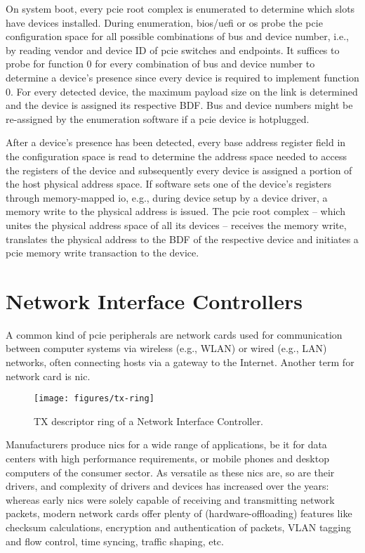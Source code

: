 On system boot, every \ac{pcie} root complex is enumerated to determine which
slots have devices installed. During enumeration, \acs{bios}/\acs{uefi} or
\ac{os} probe the \ac{pcie} configuration space for all possible combinations of
bus and device number, i.e., by reading vendor and device ID of \ac{pcie}
switches and endpoints. It suffices to probe for function 0 for every
combination of bus and device number to determine a device's presence since
every device is required to implement function 0. For every detected device, the
maximum payload size on the link is determined and the device is assigned its
respective BDF. Bus and device numbers might be re-assigned by the enumeration
software if a \ac{pcie} device is hotplugged.

After a device's presence has been detected, every base address register field
in the configuration space is read to determine the address space needed to
access the registers of the device and subsequently every device is assigned a
portion of the host physical address space. If software sets one of the device's
registers through memory-mapped \ac{io}, e.g., during device setup by a device
driver, a memory write to the physical address is issued. The \ac{pcie} root
complex -- which unites the physical address space of all its devices --
receives the memory write, translates the physical address to the BDF of the
respective device and initiates a \ac{pcie} memory write transaction to the
device.


\section{Network Interface Controllers}
\label{sec:nics}

A common kind of \ac{pcie} peripherals are network cards used for communication
between computer systems via wireless (e.g., WLAN) or wired (e.g., LAN)
networks, often connecting hosts via a gateway to the Internet. Another term for
network card is \acf{nic}.

\begin{figure}[!b]
    \centering
    \texttt{[image: figures/tx-ring]}
    \caption{TX descriptor ring of a Network Interface Controller.}
    \label{fig:tx-ring}
\end{figure}

Manufacturers produce \acp{nic} for a wide range of applications, be it for data
centers with high performance requirements, or mobile phones and desktop
computers of the consumer sector. As versatile as these \acp{nic} are, so are
their drivers, and complexity of drivers and devices has increased over the
years: whereas early \acp{nic} were solely capable of receiving and transmitting
network packets, modern network cards offer plenty of (hardware-offloading)
features like checksum calculations, encryption and authentication of packets,
VLAN tagging and flow control, time syncing, traffic shaping, etc.

